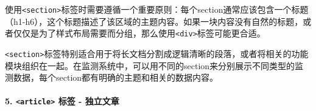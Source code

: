 使用\texttt{\textless{}section\textgreater{}}标签时需要遵循一个重要原则：每个section通常应该包含一个标题（h1-h6），这个标题描述了该区域的主题内容。如果一块内容没有自然的标题，或者仅仅是为了样式布局需要而分组，那么使用\texttt{\textless{}div\textgreater{}}标签可能更合适。

\texttt{\textless{}section\textgreater{}}标签特别适合用于将长文档分割成逻辑清晰的段落，或者将相关的功能模块组织在一起。在监测系统中，可以用不同的section来分别展示不同类型的监测数据，每个section都有明确的主题和相关的数据内容。

\begin{Shaded}
\begin{Highlighting}[]
\DataTypeTok{\textless{}}\DataTypeTok{\textgreater{}}
    \DataTypeTok{\textless{}}\DataTypeTok{\textgreater{}}\DataTypeTok{\textless{}/}\DataTypeTok{\textgreater{}}
    \DataTypeTok{\textless{}}\DataTypeTok{\textgreater{}}\DataTypeTok{\textless{}/}\DataTypeTok{\textgreater{}}
    \DataTypeTok{\textless{}}\DataTypeTok{\textgreater{}}\DataTypeTok{\textless{}/}\DataTypeTok{\textgreater{}}
    \DataTypeTok{\textless{}}\DataTypeTok{\textgreater{}}\DataTypeTok{\textless{}/}\DataTypeTok{\textgreater{}}
\DataTypeTok{\textless{}/}\DataTypeTok{\textgreater{}}

\DataTypeTok{\textless{}}\DataTypeTok{\textgreater{}}
    \DataTypeTok{\textless{}}\DataTypeTok{\textgreater{}}\DataTypeTok{\textless{}/}\DataTypeTok{\textgreater{}}
    \DataTypeTok{\textless{}}\DataTypeTok{\textgreater{}}\DataTypeTok{\textless{}/}\DataTypeTok{\textgreater{}}
    \DataTypeTok{\textless{}}\DataTypeTok{\textgreater{}}\DataTypeTok{\textless{}/}\DataTypeTok{\textgreater{}}
\DataTypeTok{\textless{}/}\DataTypeTok{\textgreater{}}
\end{Highlighting}
\end{Shaded}

\paragraph{\texorpdfstring{5. \texttt{\textless{}article\textgreater{}} 标签 - 独立文章}{5. \textless article\textgreater{} 标签 - 独立文章}}\label{article-ux6807ux7b7e---ux72ecux7acbux6587ux7ae0}

